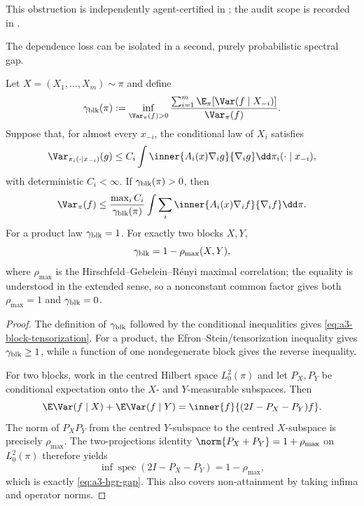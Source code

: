 \documentclass[../../main.tex]{subfiles}
\begin{document}
\noindent This obstruction is independently agent-certified in
; the audit scope is recorded in
.

The dependence loss can be isolated in a second, purely probabilistic spectral gap.

\begin{theorem}
\label{thm:a3-block-gibbs}
Let $X=(X_1,\ldots,X_m)\sim\pi$ and define
\begin{equation}\label{eq:a3-block-gap}
 \gamma_{\rm blk}(\pi)
 :=\inf_{\Var_\pi(f)>0}
 \frac{\sum_{i=1}^m\E_\pi[\Var(f\mid X_{-i})]}{\Var_\pi(f)}.
\end{equation}
Suppose that, for almost every $x_{-i}$, the conditional law of $X_i$ satisfies
\[
 \Var_{\pi_i(\cdot\mid x_{-i})}(g)
 \le C_i\int\inner{A_i(x)\nabla_i g}{\nabla_i g}
          \dd\pi_i(\cdot\mid x_{-i}),
\]
with deterministic $C_i<\infty$.  If $\gamma_{\rm blk}(\pi)>0$, then
\begin{equation}\label{eq:a3-block-tensorization}
 \Var_\pi(f)
 \le \frac{\max_iC_i}{\gamma_{\rm blk}(\pi)}
 \int\sum_i\inner{A_i(x)\nabla_i f}{\nabla_i f}\dd\pi.
\end{equation}
For a product law $\gamma_{\rm blk}=1$.  For exactly two blocks $X,Y$,
\begin{equation}\label{eq:a3-hgr-gap}
 \gamma_{\rm blk}=1-\rho_{\max}(X,Y),
\end{equation}
where $\rho_{\max}$ is the Hirschfeld--Gebelein--R\'enyi maximal correlation; the equality is
understood in the extended sense, so a nonconstant common factor gives both
$\rho_{\max}=1$ and $\gamma_{\rm blk}=0$.
\end{theorem}

\begin{proof}
The definition of $\gamma_{\rm blk}$ followed by the conditional inequalities gives
\eqref{eq:a3-block-tensorization}.  For a product, the Efron--Stein/tensorization inequality gives
$\gamma_{\rm blk}\ge1$, while a function of one nondegenerate block gives the reverse inequality.

For two blocks, work in the centred Hilbert space $L^2_0(\pi)$ and let $P_X,P_Y$ be conditional
expectation onto the $X$- and $Y$-measurable subspaces.  Then
\[
 \E\Var(f\mid X)+\E\Var(f\mid Y)
 =\inner{f}{(2I-P_X-P_Y)f}.
\]
The norm of $P_XP_Y$ from the centred $Y$-subspace to the centred $X$-subspace is precisely
$\rho_{\max}$.  The two-projections identity
$\norm{P_X+P_Y}=1+\rho_{\max}$ on $L^2_0(\pi)$ therefore yields
\[
 \inf\operatorname{spec}(2I-P_X-P_Y)=1-\rho_{\max},
\]
which is exactly \eqref{eq:a3-hgr-gap}.  This also covers non-attainment by taking infima and
operator norms.
\end{proof}
\end{document}
